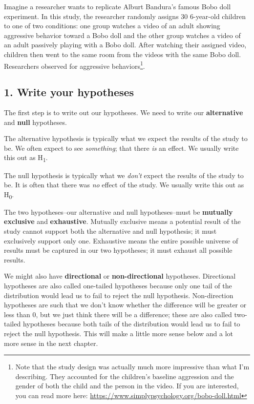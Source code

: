 \documentclass[
]{book}
\begin{document}
Imagine a researcher wants to replicate Alburt Bandura's famous Bobo doll experiment. In this study, the researcher randomly assigns 30 6-year-old children to one of two conditions: one group watches a video of an adult showing aggressive behavior toward a Bobo doll and the other group watches a video of an adult passively playing with a Bobo doll. After watching their assigned video, children then went to the same room from the videos with the same Bobo doll. Researchers observed for aggressive behaviors\footnote{Note that the study design was actually much more impressive than what I'm describing. They accounted for the children's baseline aggression and the gender of both the child and the person in the video. If you are interested, you can read more here: \url{https://www.simplypsychology.org/bobo-doll.html}}.

\hypertarget{write-your-hypotheses}{%
\subsection{1. Write your hypotheses}\label{write-your-hypotheses}}

The first step is to write out our hypotheses. We need to write our \textbf{alternative} and \textbf{null} hypotheses.

The alternative hypothesis is typically what we expect the results of the study to be. We often expect to see \emph{something}; that there \emph{is} an effect. We usually write this out as H\textsubscript{1}.

The null hypothesis is typically what we \emph{don't} expect the results of the study to be. It is often that there was \emph{no} effect of the study. We usually write this out as H\textsubscript{0}.

The two hypotheses--our alternative and null hypotheses--must be \textbf{mutually exclusive} and \textbf{exhaustive}. Mutually exclusive means a potential result of the study cannot support both the alternative and null hypothesis; it must exclusively support only one. Exhaustive means the entire possible universe of results must be captured in our two hypotheses; it must exhaust all possible results.

We might also have \textbf{directional} or \textbf{non-directional} hypotheses. Directional hypotheses are also called one-tailed hypotheses because only one tail of the distribution would lead us to fail to reject the null hypothesis. Non-direction hypotheses are such that we don't know whether the difference will be greater or less than 0, but we just think there will be a difference; these are also called two-tailed hypotheses because both tails of the distribution would lead us to fail to reject the null hypothesis. This will make a little more sense below and a lot more sense in the next chapter.
\end{document}
